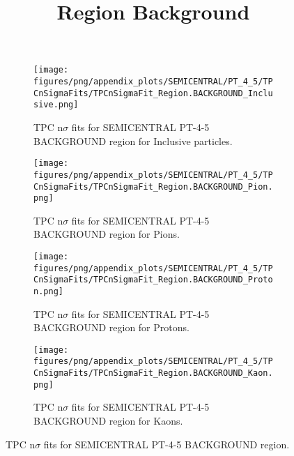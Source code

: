             \begin{figure}[H]
                \title{Region Background}
                \begin{subfigure}[b]{0.5\textwidth}
                    \centering
                    \texttt{[image: figures/png/appendix\_plots/SEMICENTRAL/PT\_4\_5/TPCnSigmaFits/TPCnSigmaFit\_Region.BACKGROUND\_Inclusive.png]}
                    \caption{TPC n$\sigma$ fits for SEMICENTRAL PT-4-5 BACKGROUND region for Inclusive particles.}
                    \label{fig:appendix_SEMICENTRAL_PT-4-5_BACKGROUND_Inclusive}
                \end{subfigure}
                \begin{subfigure}[b]{0.5\textwidth}
                    \centering
                    \texttt{[image: figures/png/appendix\_plots/SEMICENTRAL/PT\_4\_5/TPCnSigmaFits/TPCnSigmaFit\_Region.BACKGROUND\_Pion.png]}
                    \caption{TPC n$\sigma$ fits for SEMICENTRAL PT-4-5 BACKGROUND region for Pions.}
                    \label{fig:appendix_SEMICENTRAL_PT-4-5_BACKGROUND_Pion}
                \end{subfigure}
                \begin{subfigure}[b]{0.5\textwidth}
                    \centering
                    \texttt{[image: figures/png/appendix\_plots/SEMICENTRAL/PT\_4\_5/TPCnSigmaFits/TPCnSigmaFit\_Region.BACKGROUND\_Proton.png]}
                    \caption{TPC n$\sigma$ fits for SEMICENTRAL PT-4-5 BACKGROUND region for Protons.}
                    \label{fig:appendix_SEMICENTRAL_PT-4-5_BACKGROUND_Proton}
                \end{subfigure}
                \begin{subfigure}[b]{0.5\textwidth}
                    \centering
                    \texttt{[image: figures/png/appendix\_plots/SEMICENTRAL/PT\_4\_5/TPCnSigmaFits/TPCnSigmaFit\_Region.BACKGROUND\_Kaon.png]}
                    \caption{TPC n$\sigma$ fits for SEMICENTRAL PT-4-5 BACKGROUND region for Kaons.}
                    \label{fig:appendix_SEMICENTRAL_PT-4-5_BACKGROUND_Kaon}
                \end{subfigure}
                \caption{TPC n$\sigma$ fits for SEMICENTRAL PT-4-5 BACKGROUND region.}
                \label{fig:appendix_SEMICENTRAL_PT-4-5_BACKGROUND}
            \end{figure}
            \clearpage
            
    
